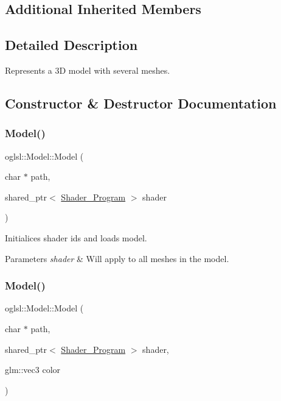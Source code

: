 \subsection*{Additional Inherited Members}


\subsection{Detailed Description}
Represents a 3D model with several meshes. 

\subsection{Constructor \& Destructor Documentation}
\mbox{\label{classoglsl_1_1_model_a1d1c934e59303cf5782cc3b45f80e462}} 
\subsubsection{\texorpdfstring{Model()}{Model()}\hspace{0.1cm}{\footnotesize\ttfamily [1/2]}}
{\footnotesize\ttfamily oglsl\+::\+Model\+::\+Model (\begin{DoxyParamCaption}\item[{char $\ast$}]{path,  }\item[{shared\+\_\+ptr$<$ \mbox{\hyperlink{classoglsl_1_1_shader___program}{Shader\+\_\+\+Program}} $>$}]{shader }\end{DoxyParamCaption})\hspace{0.3cm}{\ttfamily [inline]}}



Initialices shader ids and loads model. 


\begin{DoxyParams}{Parameters}
{\em shader} & Will apply to all meshes in the model. \\
\hline
\end{DoxyParams}
\mbox{\label{classoglsl_1_1_model_ab3c8fe28157eaa2fd01646a0fc081f0f}} 
\subsubsection{\texorpdfstring{Model()}{Model()}\hspace{0.1cm}{\footnotesize\ttfamily [2/2]}}
{\footnotesize\ttfamily oglsl\+::\+Model\+::\+Model (\begin{DoxyParamCaption}\item[{char $\ast$}]{path,  }\item[{shared\+\_\+ptr$<$ \mbox{\hyperlink{classoglsl_1_1_shader___program}{Shader\+\_\+\+Program}} $>$}]{shader,  }\item[{glm\+::vec3}]{color }\end{DoxyParamCaption})\hspace{0.3cm}{\ttfamily [inline]}}



